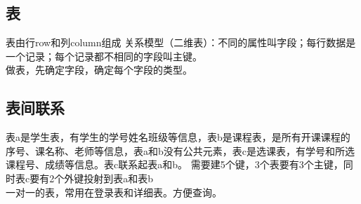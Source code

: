 \documentclass[UTF8]{../computerUniverse}
\begin{document}
    
    \subsection{表}
    表由行row和列column组成
    关系模型（二维表）：不同的属性叫字段；每行数据是一个记录；每个记录都不相同的字段叫主键。\\
    做表，先确定字段，确定每个字段的类型。
    
    \begin{comment}
        CREATE TABLE IF NOT EXISTS table_name(
            字段名称 字段类型 [可选：完整性约束条件]
    
        ) EIGEN=存储引擎, charset=编码方式
    
        数值类型：
            整形
            TINYINT (-128, 127) or (0, 255)，即8次幂，1字节
            SMALLINT 16次幂，2字节
            MEDIUMINT 24次幂，3字节
            INT (-2^31, 2^31-1) or (0, 2^24-1)，32次幂，4字节
            BIGINT 64次幂，8字节
            BOOL, BOOLEAN, 等价于TINYINT(1)，1字节
    
            浮点型
            FLOAT[(M,D)],M是总位数，D是小数位数，单精度浮点数精度大约7位小数。不设置时根据硬件条件设置
            取值范围(-3.4e38, -1.17e-38) & 0 & (1.175e-38, 3.4e38), 4字节
            DOUBLE[(M,D)],M是总位数，D是小数位数，取值范围(-1.79e308, -2.22e-308) & 0 & (2.22e-308, 1.79e308), 8字节
            DECIMAL[(M,D)],M是总位数，D是小数位数，类似DOUBLE，内部以字符串形式存储，字节M+2
    
            字符串类型
            CHAR(M), 定长串, M字节, M=[0,255]
            VAARCHAR(M), 变长串, 所占字节为L+1   小于M，M=[0,2^16-1],65536-1
            TINYTEXT, L < 2^8，L+1字节
            TEXT, L < 2^16，L+2字节
            MEDIUMTEXT, L < 2^24，L+3字节
            LONGTEXT, L < 2^32，L+4字节
            ENUM('VALUE1', 'VALUE2',...), 枚举，1或2字节，取决于枚举个数，最多2^16-1个值
            SET('VALUE1', 'VALUE2',...), 集合，1或2或3或4或8字节，取决于set成员个数，最多64个值
    
            日期类型:
            DATE, 3字节
            TIME, 3字节
            YEAR, 1字节
            DATETIME, 8字节
            TIMESTAMP 4字节
    
            二进制类型：
            不常用。
        
    
    \end{comment}
    
    
    
    
    \subsection{表间联系}
    表a是学生表，有学生的学号姓名班级等信息，表b是课程表，是所有开课课程的序号、课名称、老师等信息，表a和b没有公共元素，表c是选课表，有学号和所选课程号、成绩等信息。表c联系起表a和b。
    需要建5个键，3个表要有3个主键，同时表c要有2个外键投射到表a和表b\\
    一对一的表，常用在登录表和详细表。方便查询。
    
\end{document}
